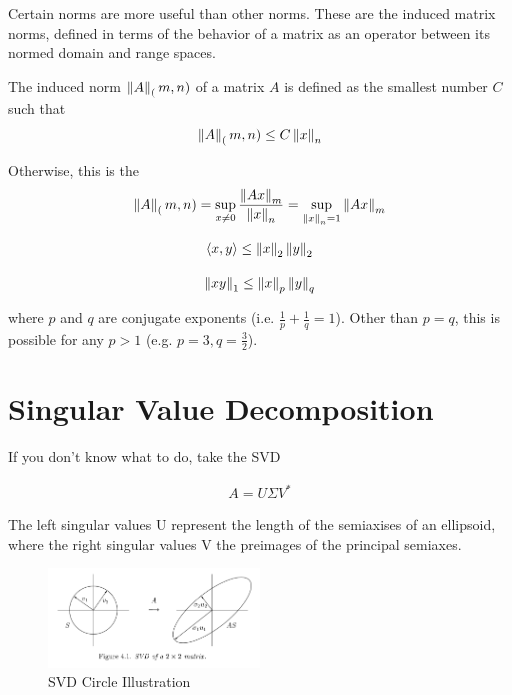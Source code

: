 \documentclass[11pt]{article}
\begin{document}
Certain norms are more useful than other norms. These are the induced matrix norms,
defined in terms of the behavior of a matrix as an operator between its normed domain and 
range spaces.

The induced norm $\left\lVert A\right\rVert_(m, n)$ of a matrix $A$ is defined as the smallest
number $C$ such that
\begin{align*}
  \left\lVert A\right\rVert_(m, n) \leq C \left\lVert x\right\rVert_n
\end{align*}

Otherwise, this is the 
\begin{align*}
  \left\lVert A\right\rVert_(m, n) = \sup_{x \neq 0} \frac{\left\lVert Ax\right\rVert_m}{\left\lVert x\right\rVert_n} = \sup_{\left\lVert x\right\rVert_n = 1} \left\lVert Ax\right\rVert_m
\end{align*}


\begin{align*}
  \langle x, y \rangle \leq \left\lVert x\right\rVert_2 \left\lVert y\right\rVert_2
\end{align*}

\begin{align*}
  \left\lVert xy\right\rVert_1 \leq \left\lVert x\right\rVert_p \left\lVert y\right\rVert_q
\end{align*}

where $p$ and $q$ are conjugate exponents (i.e. $\frac{1}{p} + \frac{1}{q} = 1$). Other than $p=q$, this is possible for any $p>1$ (e.g. $p=3, q=\tfrac{3}{2}$).

\section{Singular Value Decomposition}

If you don't know what to do, take the SVD

\begin{align*}
  A = U \Sigma V^*
\end{align*}

The left singular values U represent the length of the semiaxises of an ellipsoid, 
where the right singular values V the preimages of the principal semiaxes.

\begin{figure}[ht]
  \centering
  \includegraphics[width=0.5\textwidth]{SVD_Circle.png}
  \caption{SVD Circle Illustration}
  \label{fig:svd-circle}
\end{figure}
\end{document}
